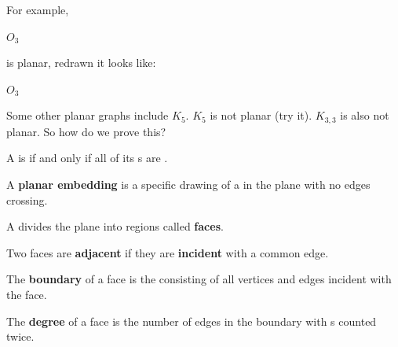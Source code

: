 \documentclass[english, 11pt]{article}
\begin{document}
For example,
\begin{center}$O_3$
\end{center}
is planar, redrawn it looks like:
\begin{center}$O_3$
\end{center}

Some other planar graphs include $K_5$. $K_5$ is not planar (try it). $K_{3,3}$ is also not planar. So how do we prove this?

\begin{note}
  A  is  if and only if all of its s are .
\end{note}

\begin{defn}\label{planar embedding}
A \textbf{planar embedding} is a specific drawing of a  in the plane with no edges crossing.
\end{defn}

\begin{defn}[face]\label{face}
A  divides the plane into regions called \textbf{faces}.
\end{defn}
  \begin{defn}[adjacent]\label{adjacent}
  Two faces are \textbf{adjacent} if they are \textbf{incident} with a common edge.
  \end{defn}
  \begin{defn}[boundary]\label{boundary}
  The \textbf{boundary} of a face is the  consisting of all vertices and edges incident with the face.
  \end{defn}
  \begin{defn}[degree]\label{pdegree}
  The \textbf{degree} of a face is the number of edges in the boundary with s counted twice.
  \end{defn}
\end{document}
